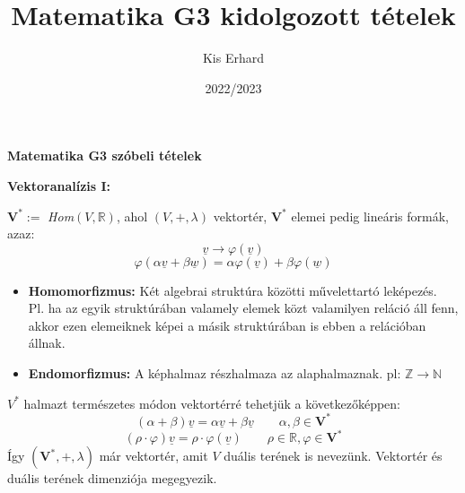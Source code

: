 \documentclass[11pt,a4paper]{article}
\title{Matematika G3 kidolgozott tételek}
\author{Kis Erhard}
\date{2022/2023}
\begin{document}
\maketitle
\newpage

\begin{center}
    \textbf{Matematika G3 szóbeli tételek}
\end{center}
\textbf{Vektoranalízis I:}

    \begin{tcolorbox}[colback=red!5!white,colframe=red!60!black,title= 1. Duális tér]
    $\mathbf{V}^* :=$ \textit{Hom}$(V,\mathbb{R})$, ahol $(V,+, \lambda)$ vektortér, $\mathbf{V}^*$ elemei pedig lineáris formák, azaz:
    $$\underline{v} \rightarrow \varphi(\underline{v})$$
    $$\varphi(\alpha\underline{v} + \beta\underline{w}) = \alpha\varphi(\underline{v}) + \beta\varphi(\underline{w})$$
    \begin{itemize}
        \item \textbf{Homomorfizmus:} Két algebrai struktúra közötti művelettartó leképezés. \\
        Pl. ha az egyik struktúrában valamely elemek közt valamilyen reláció áll fenn, akkor ezen elemeiknek képei a másik struktúrában is ebben a relációban állnak.
        \item \textbf{Endomorfizmus:} A képhalmaz részhalmaza az alaphalmaznak. pl: $\mathbb{Z} \rightarrow \mathbb{N}$
    \end{itemize}
    $V^*$ halmazt természetes módon vektortérré tehetjük a következőképpen:
    $$(\alpha + \beta )\underline{v} = \alpha\underline{v} + \beta\underline{v} \quad\quad \alpha,\beta \in \mathbf{V}^*$$
    $$(\rho \cdot \varphi)\underline{v} = \rho \cdot \varphi(\underline{v}) \quad\quad \rho \in \mathbb{R}, \varphi \in \mathbf{V}^*$$
    Így $(\mathbf{V}^*, +, \lambda)$ már vektortér, amit $V$ duális terének is nevezünk. Vektortér és duális terének dimenziója megegyezik. 
    \end{tcolorbox}
\end{document}
